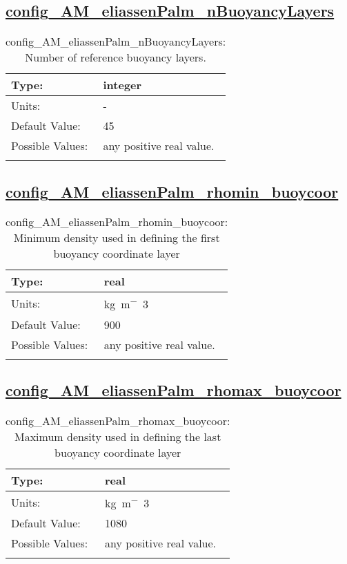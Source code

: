 \subsection[config\_AM\_eliassenPalm\_nBuoyancyLayers]{\hyperref[sec:nm_tab_AM_eliassenPalm]{config\_AM\_eliassenPalm\_nBuoyancyLayers}}
\label{subsec:nm_sec_config_AM_eliassenPalm_nBuoyancyLayers}
\begin{center}
\begin{longtable}{| p{2.0in} || p{4.0in} |}
    \hline
    Type: & integer \\
    \hline
    Units: & \si{-} \\
    \hline
    Default Value: & 45 \\
    \hline
    Possible Values: & any positive real value. \\
    \hline
    \caption{config\_AM\_eliassenPalm\_nBuoyancyLayers: Number of reference buoyancy layers.}
\end{longtable}
\end{center}
\subsection[config\_AM\_eliassenPalm\_rhomin\_buoycoor]{\hyperref[sec:nm_tab_AM_eliassenPalm]{config\_AM\_eliassenPalm\_rhomin\_buoycoor}}
\label{subsec:nm_sec_config_AM_eliassenPalm_rhomin_buoycoor}
\begin{center}
\begin{longtable}{| p{2.0in} || p{4.0in} |}
    \hline
    Type: & real \\
    \hline
    Units: & \si{kg.m^-3} \\
    \hline
    Default Value: & 900 \\
    \hline
    Possible Values: & any positive real value. \\
    \hline
    \caption{config\_AM\_eliassenPalm\_rhomin\_buoycoor: Minimum density used in defining the first buoyancy coordinate layer}
\end{longtable}
\end{center}
\subsection[config\_AM\_eliassenPalm\_rhomax\_buoycoor]{\hyperref[sec:nm_tab_AM_eliassenPalm]{config\_AM\_eliassenPalm\_rhomax\_buoycoor}}
\label{subsec:nm_sec_config_AM_eliassenPalm_rhomax_buoycoor}
\begin{center}
\begin{longtable}{| p{2.0in} || p{4.0in} |}
    \hline
    Type: & real \\
    \hline
    Units: & \si{kg.m^-3} \\
    \hline
    Default Value: & 1080 \\
    \hline
    Possible Values: & any positive real value. \\
    \hline
    \caption{config\_AM\_eliassenPalm\_rhomax\_buoycoor: Maximum density used in defining the last buoyancy coordinate layer}
\end{longtable}
\end{center}
